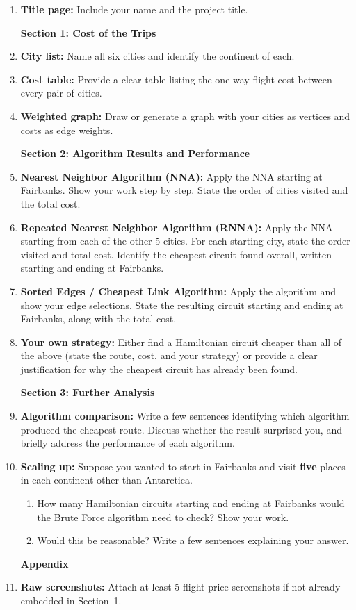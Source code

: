 \documentclass[11pt]{article}
\begin{document}
\begin{enumerate}[leftmargin=*, label=\(\square\)]

\item \textbf{Title page:} Include your name and the project title.

\hspace*{-.2in}\textbf{Section 1: Cost of the Trips}
  \item \textbf{City list:} Name all six cities and identify the continent of each.
  \item \textbf{Cost table:} Provide a clear table listing the one-way flight cost between every pair of cities.
  \item \textbf{Weighted graph:} Draw or generate a graph with your cities as vertices and costs as edge weights.

\hspace*{-.2in}\textbf{Section 2: Algorithm Results and Performance}
  \item \textbf{Nearest Neighbor Algorithm (NNA):} Apply the NNA starting at Fairbanks. Show your work step by step. State the order of cities visited and the total cost.
  \item \textbf{Repeated Nearest Neighbor Algorithm (RNNA):} Apply the NNA starting from each of the other 5 cities. For each starting city, state the order visited and total cost. Identify the cheapest circuit found overall, written starting and ending at Fairbanks.
  \item \textbf{Sorted Edges / Cheapest Link Algorithm:} Apply the algorithm and show your edge selections. State the resulting circuit starting and ending at Fairbanks, along with the total cost.
  \item \textbf{Your own strategy:} Either find a Hamiltonian circuit cheaper than all of the above (state the route, cost, and your strategy) or provide a clear justification for why the cheapest circuit has already been found.

\hspace*{-.2in}\textbf{Section 3: Further Analysis}
  \item \textbf{Algorithm comparison:} Write a few sentences identifying which algorithm produced the cheapest route. Discuss whether the result surprised you, and briefly address the performance of each algorithm.
  \item \textbf{Scaling up:} Suppose you wanted to start in Fairbanks and visit \textbf{five} places in each continent other than Antarctica.
  \begin{enumerate}[label=(\alph*)]
    \item How many Hamiltonian circuits starting and ending at Fairbanks would the Brute Force algorithm need to check? Show your work.
    \item  Would this be reasonable? Write a few sentences explaining your answer.
  \end{enumerate}

\hspace*{-.2in}\noindent\textbf{Appendix}
  \item \textbf{Raw screenshots:} Attach at least 5 flight-price screenshots if not already embedded in Section~1.

\end{enumerate}
\end{document}
